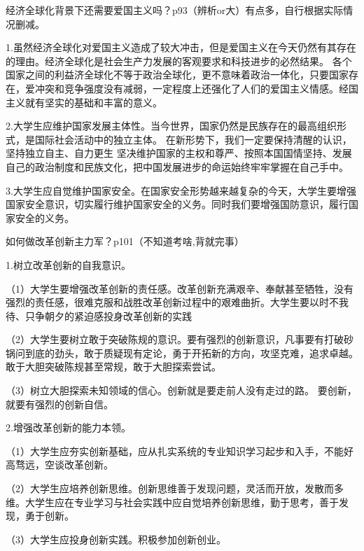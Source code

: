 \documentclass[lang=cn,10pt]{elegantbook}
\begin{document}
	\begin{example}
		经济全球化背景下还需要爱国主义吗？p93（辨析or大）有点多，自行根据实际情况删减。
	\end{example}
	\begin{solution}
		
		1.虽然经济全球化对爱国主义造成了较大冲击，但是爱国主义在今天仍然有其存在的理由。经济全球化是社会生产力发展的客观要求和科技进步的必然结果。 各个国家之间的利益济全球化不等于政治全球化，更不意味着政治一体化，只要国家存在，爱冲突和竞争强度没有减弱，一定程度上还强化了人们的爱国主义情感。经国主义就有坚实的基础和丰富的意义。
		
		2.大学生应维护国家发展主体性。当今世界，国家仍然是民族存在的最高组织形式，是国际社会活动中的独立主体。 在新形势下，我们一定要保持清醒的认识，坚持独立自主、自力更生 坚决维护国家的主权和尊严、按照本国国情坚持、发展自己的政治制度和民族文化，把中国发展进步的命运始终牢牢掌握在自己手中。
		
		3.大学生应自觉维护国家安全。在国家安全形势越来越复杂的今天，大学生要增强国家安全意识，切实履行维护国家安全的义务。同时我们要增强国防意识，履行国家安全的义务。
		
	\end{solution}
	\begin{example}
		如何做改革创新主力军？p101（不知道考啥,背就完事）
	\end{example}
	\begin{solution}
		1.树立改革创新的自我意识。
		
		（1）大学生要增强改革创新的责任感。改革创新充满艰辛、奉献甚至牺牲，没有强烈的责任感，很难克服和战胜改革创新过程中的艰难曲折。大学生要以时不我待、只争朝夕的紧迫感投身改革创新的实践
		
		（2）大学生要树立敢于突破陈规的意识。要有强烈的创新意识，凡事要有打破砂锅问到底的劲头，敢于质疑现有定论，勇于开拓新的方向，攻坚克难，追求卓越。敢于大胆突破陈规甚至常规，敢于大胆探索尝试。
		
		（3）树立大胆探索未知领域的信心。创新就是要走前人没有走过的路。
		要创新，就要有强烈的创新自信。	
		
		2.增强改革创新的能力本领。
		
		（1）大学生应夯实创新基础，应从扎实系统的专业知识学习起步和入手，不能好高骛远，空谈改革创新。
		
		（2）大学生应培养创新思维。创新思维善于发现问题，灵活而开放，发散而多维。大学生应在专业学习与社会实践中应自觉培养创新思维，勤于思考，善于发现，勇于创新。
		
		（3）大学生应投身创新实践。积极参加创新创业。
	\end{solution}
\end{document}
